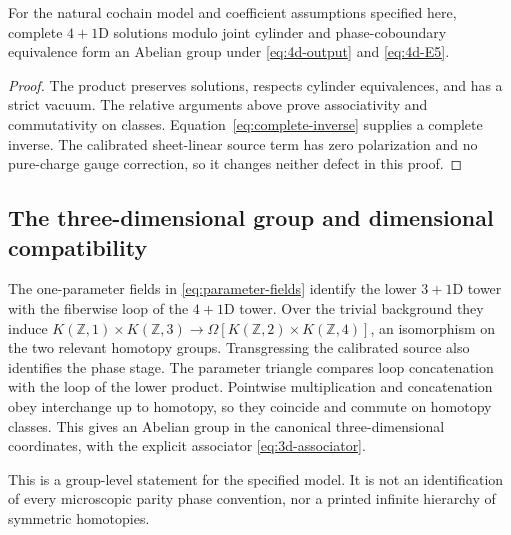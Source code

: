 \begin{theorem}\label{thm:abelian}
For the natural cochain model and coefficient assumptions specified here, complete $4+1$D solutions modulo joint cylinder and phase-coboundary equivalence form an Abelian group under \eqref{eq:4d-output} and \eqref{eq:4d-E5}.
\end{theorem}
\begin{proof}
The product preserves solutions, respects cylinder equivalences, and has a strict vacuum. The relative arguments above prove associativity and commutativity on classes. Equation~\eqref{eq:complete-inverse} supplies a complete inverse. The calibrated sheet-linear source term has zero polarization and no pure-charge gauge correction, so it changes neither defect in this proof.
\end{proof}

\subsection{The three-dimensional group and dimensional compatibility}\label{subsec:loopgroup}
The one-parameter fields in \eqref{eq:parameter-fields} identify the lower $3+1$D tower with the fiberwise loop of the $4+1$D tower. Over the trivial background they induce
$K(\mathbb Z,1)\times K(\mathbb Z,3)
\to\Omega[K(\mathbb Z,2)\times K(\mathbb Z,4)]$,
an isomorphism on the two relevant homotopy groups. Transgressing the calibrated source also identifies the phase stage. The parameter triangle compares loop concatenation with the loop of the lower product. Pointwise multiplication and concatenation obey interchange up to homotopy, so they coincide and commute on homotopy classes. This gives an Abelian group in the canonical three-dimensional coordinates, with the explicit associator \eqref{eq:3d-associator}.

This is a group-level statement for the specified model. It is not an identification of every microscopic parity phase convention, nor a printed infinite hierarchy of symmetric homotopies.

